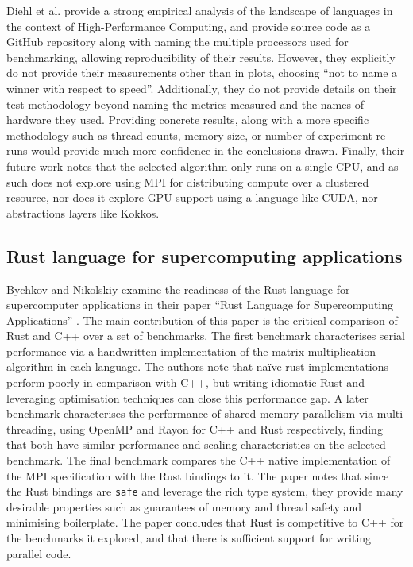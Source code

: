 Diehl et al. provide a strong empirical analysis of the landscape of languages in the context of High-Performance Computing, and provide source code as a GitHub repository \cite{} along with naming the multiple processors used for benchmarking, allowing reproducibility of their results. However, they explicitly do not provide their measurements other than in plots, choosing ``not to name a winner with respect to speed''. Additionally, they do not provide details on their test methodology beyond naming the metrics measured and the names of hardware they used. Providing concrete results, along with a more specific methodology such as thread counts, memory size, or number of experiment re-runs would provide much more confidence in the conclusions drawn. Finally, their future work notes that the selected algorithm only runs on a single CPU, and as such does not explore using MPI for distributing compute over a clustered resource, nor does it explore GPU support using a language like CUDA, nor abstractions layers like Kokkos.

\subsection{Rust language for supercomputing applications}
\label{ssec:bychkov-nikolskiy}

Bychkov and Nikolskiy examine the readiness of the Rust language for supercomputer applications in their paper ``Rust Language for Supercomputing Applications'' \cite{bychkovRustLanguageSupercomputing2021}. The main contribution of this paper is the critical comparison of Rust and C++ over a set of benchmarks. The first benchmark characterises serial performance via a handwritten implementation of the matrix multiplication algorithm in each language. The authors note that na\"ive rust implementations perform poorly in comparison with C++, but writing idiomatic Rust and leveraging optimisation techniques can close this performance gap. A later benchmark characterises the performance of shared-memory parallelism via multi-threading, using OpenMP and Rayon for C++ and Rust respectively, finding that both have similar performance and scaling characteristics on the selected benchmark. The final benchmark compares the C++ native implementation of the MPI specification with the Rust bindings to it. The paper notes that since the Rust bindings are \texttt{safe} and leverage the rich type system, they provide many desirable properties such as guarantees of memory and thread safety and minimising boilerplate. The paper concludes that Rust is competitive to C++ for the benchmarks it explored, and that there is sufficient support for writing parallel code.


